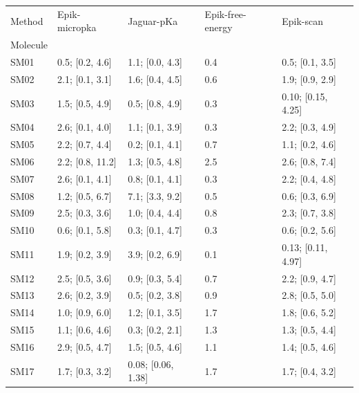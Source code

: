 \documentclass[9pt,lineno,final]{elife}
\begin{document}
\begin{tabular}{lllll}
\toprule
Method &     Epik-micropka &          Jaguar-pKa & Epik-free-energy &           Epik-scan \\
Molecule &                   &                     &                  &                     \\
\midrule
SM01     &   0.5; [0.2, 4.6] &     1.1; [0.0, 4.3] &              0.4 &     0.5; [0.1, 3.5] \\
SM02     &   2.1; [0.1, 3.1] &     1.6; [0.4, 4.5] &              0.6 &     1.9; [0.9, 2.9] \\
SM03     &   1.5; [0.5, 4.9] &     0.5; [0.8, 4.9] &              0.3 &  0.10; [0.15, 4.25] \\
SM04     &   2.6; [0.1, 4.0] &     1.1; [0.1, 3.9] &              0.3 &     2.2; [0.3, 4.9] \\
SM05     &   2.2; [0.7, 4.4] &     0.2; [0.1, 4.1] &              0.7 &     1.1; [0.2, 4.6] \\
SM06     &  2.2; [0.8, 11.2] &     1.3; [0.5, 4.8] &              2.5 &     2.6; [0.8, 7.4] \\
SM07     &   2.6; [0.1, 4.1] &     0.8; [0.1, 4.1] &              0.3 &     2.2; [0.4, 4.8] \\
SM08     &   1.2; [0.5, 6.7] &     7.1; [3.3, 9.2] &              0.5 &     0.6; [0.3, 6.9] \\
SM09     &   2.5; [0.3, 3.6] &     1.0; [0.4, 4.4] &              0.8 &     2.3; [0.7, 3.8] \\
SM10     &   0.6; [0.1, 5.8] &     0.3; [0.1, 4.7] &              0.3 &     0.6; [0.2, 5.6] \\
SM11     &   1.9; [0.2, 3.9] &     3.9; [0.2, 6.9] &              0.1 &  0.13; [0.11, 4.97] \\
SM12     &   2.5; [0.5, 3.6] &     0.9; [0.3, 5.4] &              0.7 &     2.2; [0.9, 4.7] \\
SM13     &   2.6; [0.2, 3.9] &     0.5; [0.2, 3.8] &              0.9 &     2.8; [0.5, 5.0] \\
SM14     &   1.0; [0.9, 6.0] &     1.2; [0.1, 3.5] &              1.7 &     1.8; [0.6, 5.2] \\
SM15     &   1.1; [0.6, 4.6] &     0.3; [0.2, 2.1] &              1.3 &     1.3; [0.5, 4.4] \\
SM16     &   2.9; [0.5, 4.7] &     1.5; [0.5, 4.6] &              1.1 &     1.4; [0.5, 4.6] \\
SM17     &   1.7; [0.3, 3.2] &  0.08; [0.06, 1.38] &              1.7 &     1.7; [0.4, 3.2] \\

\end{tabular}
\end{document}
